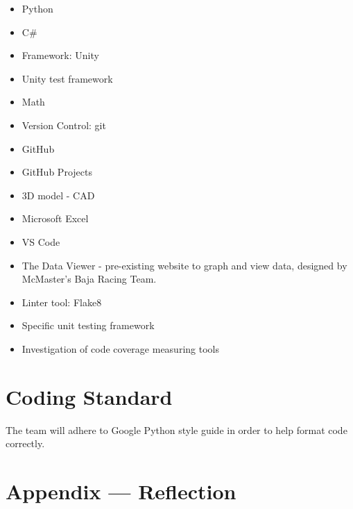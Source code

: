 \documentclass{article}
\begin{document}

\begin{itemize}
\item Python
\item C\#
\item Framework: Unity
\item Unity test framework
\item Math
\item Version Control: git
\item GitHub
\item GitHub Projects
\item 3D model - CAD
\item Microsoft Excel
\item VS Code
\item The Data Viewer - pre-existing website to graph and view data, designed by McMaster's Baja Racing Team.
\item Linter tool: Flake8
\item Specific unit testing framework
\item Investigation of code coverage measuring tools
\end{itemize}

\section{Coding Standard}

The team will adhere to Google Python style guide in order to help format code correctly. 

\newpage{}

\section*{Appendix --- Reflection}



\end{document}
